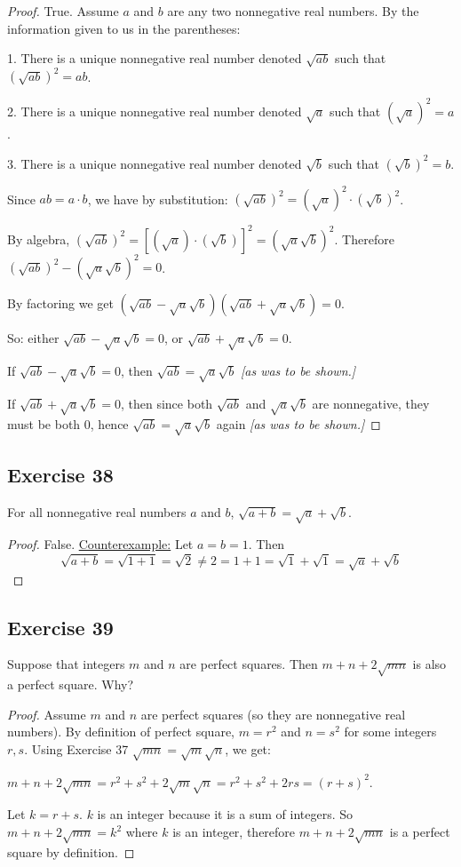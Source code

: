 \documentclass[14pt]{extarticle}
\begin{document}
\begin{proof}
True. Assume $a$ and $b$ are any two nonnegative real numbers. By the information given to us in the parentheses: 

1. There is a unique nonnegative real number denoted $\sqrt{ab}$ such that $(\sqrt{ab})^2 = ab$.

2. There is a unique nonnegative real number denoted $\sqrt{a}$ such that $(\sqrt{a})^2 = a$.

3. There is a unique nonnegative real number denoted $\sqrt{b}$ such that $(\sqrt{b})^2 = b$.

Since $ab = a \cdot b$, we have by substitution: $(\sqrt{ab})^2 = (\sqrt{a})^2 \cdot (\sqrt{b})^2$.

By algebra, $(\sqrt{ab})^2 = [(\sqrt{a}) \cdot (\sqrt{b})]^2 = (\sqrt{a}\sqrt{b})^2$. Therefore $(\sqrt{ab})^2 - (\sqrt{a}\sqrt{b})^2 = 0$.

By factoring we get $(\sqrt{ab} - \sqrt{a}\sqrt{b})(\sqrt{ab} + \sqrt{a}\sqrt{b}) = 0$.

So: either $\sqrt{ab} - \sqrt{a}\sqrt{b} = 0$, or $\sqrt{ab} + \sqrt{a}\sqrt{b} = 0$.

If $\sqrt{ab} - \sqrt{a}\sqrt{b} = 0$, then $\sqrt{ab} = \sqrt{a}\sqrt{b}$ {\it [as was to be shown.]}

If $\sqrt{ab} + \sqrt{a}\sqrt{b} = 0$, then since both $\sqrt{ab}$ and $\sqrt{a}\sqrt{b}$ are nonnegative, they must be both 0, hence $\sqrt{ab} = \sqrt{a}\sqrt{b}$ again {\it [as was to be shown.]}
\end{proof}

\subsection{Exercise 38}
For all nonnegative real numbers $a$ and $b$, $\sqrt{a + b} = \sqrt{a} + \sqrt{b}$.

\begin{proof}
False. \underline{Counterexample:} Let $a = b = 1$. Then 
$$
\sqrt{a+b} = \sqrt{1+1} = \sqrt{2} \neq 2 = 1 + 1 = \sqrt{1} + \sqrt{1} = \sqrt{a} + \sqrt{b}
$$
\end{proof}

\subsection{Exercise 39}
Suppose that integers $m$ and $n$ are perfect squares. Then $m + n + 2\sqrt{mn}$ is also a perfect square. Why?

\begin{proof}
Assume $m$ and $n$ are perfect squares (so they are nonnegative real numbers). By definition of perfect square, $m = r^2$ and $n = s^2$ for some integers $r, s$. Using Exercise 37 $\sqrt{mn} = \sqrt{m}\sqrt{n}$, we get:

$m + n + 2\sqrt{mn} = r^2 + s^2 + 2\sqrt{m}\sqrt{n} = r^2 + s^2 + 2rs = (r+s)^2$.

Let $k = r+s$. $k$ is an integer because it is a sum of integers. So $m + n + 2\sqrt{mn} = k^2$ where $k$ is an integer, therefore $m + n + 2\sqrt{mn}$ is a perfect square by definition.

\end{proof}
\end{document}
